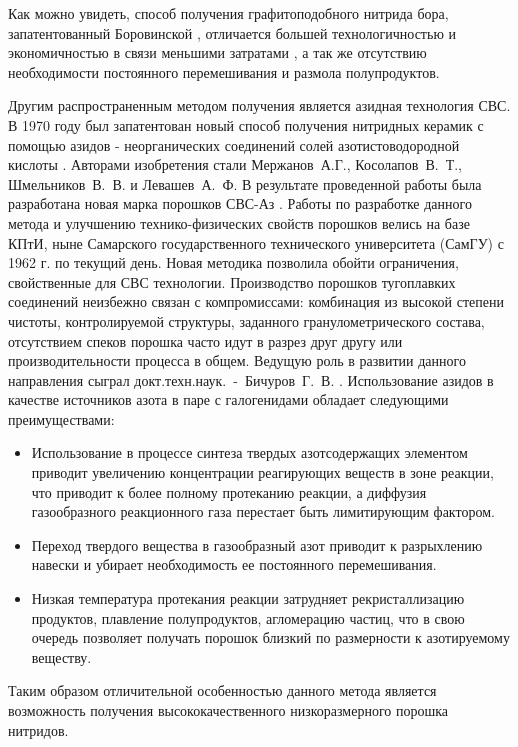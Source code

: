 Как можно увидеть, способ получения графитоподобного нитрида бора,
запатентованный Боровинской \cite[]{__1999}, отличается большей технологичностью
и экономичностью в связи меньшими затратами , а так же отсутствию необходимости
постоянного перемешивания и размола полупродуктов.

Другим распространенным методом получения является азидная технология СВС.
В 1970 году был запатентован новый способ получения нитридных керамик с помощью
азидов - неорганических соединений солей азотистоводородной кислоты \cite[]{moss_glossary_1995}.
Авторами изобретения стали Мержанов~А.Г., Косолапов~В.~Т., Шмельников~В.~В. и
Левашев~А.~Ф. В результате проведенной работы была разработана новая марка
порошков СВС-Аз \cite{amosov2007azidnaa}. Работы по разработке данного метода 
и улучшению технико-физических свойств порошков велись на базе КПтИ, ныне Самарского
государственного технического университета (СамГУ) с 1962 г. по текущий день.
Новая методика позволила обойти ограничения, свойственные для СВС технологии.
Производство порошков тугоплавких соединений неизбежно связан с компромиссами:
комбинация из высокой степени чистоты, контролируемой структуры, заданного
гранулометрического состава, отсутствием спеков порошка часто идут в разрез друг
другу или производительности процесса в общем. Ведущую роль в развитии данного 
направления сыграл докт.техн.наук.~-~Бичуров~Г.~В. \cite[]{__2003}. 
Использование азидов в качестве источников азота в паре с галогенидами обладает
следующими преимуществами:

\begin{itemize}
    \item Использование в процессе синтеза твердых азотсодержащих элементом приводит
    увеличению концентрации реагирующих веществ в зоне реакции, что приводит к 
    более полному протеканию реакции, а диффузия газообразного реакционного газа
    перестает быть лимитирующим фактором.
    \item Переход твердого вещества в газообразный азот приводит к разрыхлению навески
    и убирает необходимость ее постоянного перемешивания.
    \item Низкая температура протекания реакции затрудняет рекристаллизацию продуктов,
    плавление полупродуктов, агломерацию частиц, что в свою очередь позволяет
    получать порошок близкий по размерности к азотируемому веществу.
\end{itemize}

Таким образом отличительной особенностью данного метода является возможность
получения высококачественного низкоразмерного порошка нитридов.

